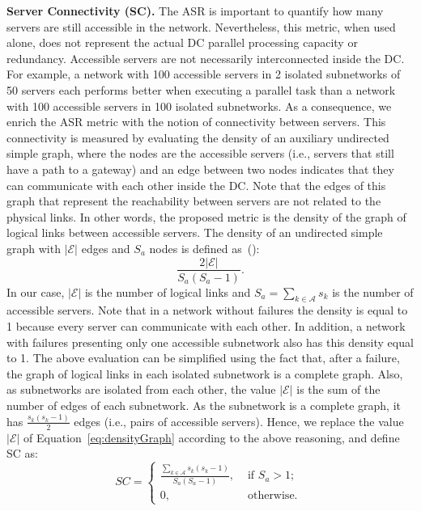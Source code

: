 \textbf{Server Connectivity (SC).} The ASR is important to quantify how many servers are still accessible in the network. Nevertheless, this metric, when used alone, does not represent the actual DC parallel processing capacity or redundancy. Accessible servers are not necessarily interconnected inside the DC. For example, a network with 100 accessible servers in 2 isolated subnetworks of 50 servers each performs better when executing a parallel task than a network with 100 accessible servers in 100 isolated subnetworks. As a consequence, we enrich the ASR metric with the notion of connectivity between servers. This connectivity is measured by evaluating the density of an auxiliary undirected simple graph, where the nodes are the accessible servers (i.e., servers that still have a path to a gateway) and an edge between two nodes indicates that they can communicate with each other inside the DC. Note that the edges of this graph that represent the reachability between servers are not related to the 
physical links. In other words, the 
proposed metric is the density of the graph of logical links between accessible servers. The density of an undirected simple graph with $\mathcal{|E|}$ edges and $S_a$ nodes is defined as~(\cite{coleman1983estimation}):
\begin{equation}
\frac{2\mathcal{|E|}}{S_a(S_a-1)}.
\label{eq:densityGraph}
\end{equation}
In our case, $\mathcal{|E|}$ is the number of logical links and $S_a=\sum_{k \in \mathcal{A}}s_k$ is the number of accessible servers. Note that in a network without failures the density is equal to 1 because every server can communicate with each other. In addition, a network with failures presenting only one accessible subnetwork also has this density equal to 1. The above evaluation can be simplified using the fact that, after a failure, the graph of logical links in each isolated subnetwork is a complete graph. Also, as subnetworks are isolated from each other, the value $\mathcal{|E|}$ is the sum of the number of edges of each subnetwork. As the subnetwork is a complete graph, it has $\frac{s_k(s_k-1)}{2}$ edges (i.e., pairs of accessible servers). Hence, we replace the value $\mathcal{|E|}$ of Equation~\ref{eq:densityGraph} according to the above reasoning, and define SC as:
\begin{equation}
SC= \begin{cases} 
	\frac{\sum_{k \in \mathcal{A}}s_k(s_k-1)}{S_a(S_a-1)}, &\text{ if } S_a > 1;\\
	0, &\text{ otherwise. }
    \end{cases}
\end{equation}

